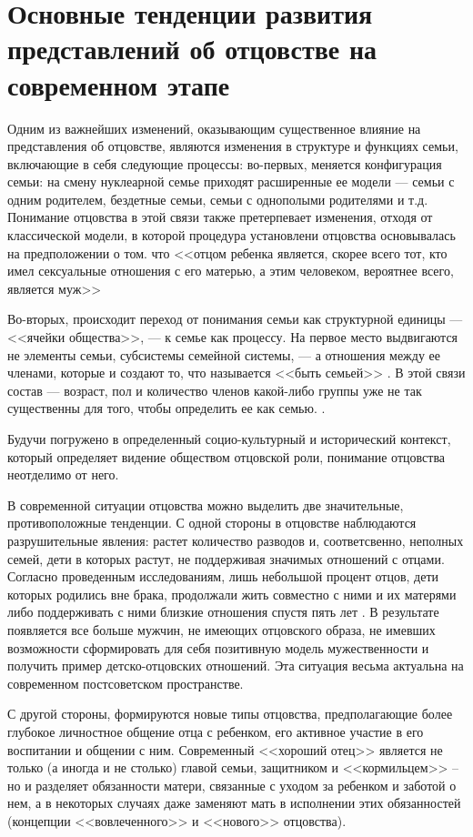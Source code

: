 \documentclass{../../common/thesisbyxetex}
\begin{document}
\section{Основные тенденции развития представлений об отцовстве на современном этапе}

Одним из важнейших изменений, оказывающим существенное влияние на представления об отцовстве,
являются
изменения в структуре и функциях семьи,  включающие в себя следующие процессы:
во-первых, меняется конфигурация семьи: на смену нуклеарной семье приходят расширенные
ее модели --- семьи с одним родителем, бездетные семьи, семьи с однополыми родителями и т.д.
Понимание отцовства
в этой связи также претерпевает изменения, отходя от классической модели, в которой процедура
установлени отцовства основывалась на предположении о том. что <<отцом ребенка является, скорее
всего
 тот, кто имел сексуальные отношения с его матерью, а этим человеком, вероятнее всего,
является муж>> \cite[318]{legfat}

Во-вторых, происходит переход от понимания семьи как структурной единицы --- <<ячейки общества>>,
--- к семье как процессу. На первое место выдвигаются не элементы семьи, субсистемы семейной
системы, --- а отношения между ее членами, которые и создают то, что называется <<быть семьей>>
\cite{fam}. В этой связи состав  --- возраст, пол и количество  членов какой-либо группы уже не так
существенны для того, чтобы определить  ее как семью. \cite[15]{fatpsy}.

Будучи погружено в определенный социо-культурный и исторический контекст, который определяет
видение обществом
отцовской роли, понимание отцовства неотделимо от него.

В современной ситуации отцовства можно выделить две значительные, противоположные
тенденции. С одной стороны  в отцовстве наблюдаются разрушительные явления: растет количество
разводов и, соответсвенно, неполных семей, дети в которых растут, не поддерживая значимых отношений
с отцами. Согласно проведенным исследованиям, лишь небольшой процент отцов, дети которых
родились вне брака, продолжали жить совместно с ними и их матерями либо поддерживать с ними близкие
отношения спустя пять лет \cite{long}. В результате появляется все больше мужчин, не имеющих
отцовского образа, не имевших возможности сформировать для себя позитивную модель мужественности и
получить пример детско-отцовских отношений. Эта ситуация весьма актуальна на современном
постсоветском пространстве.

С другой стороны, формируются новые типы отцовства, предполагающие более глубокое личностное 
общение отца с ребенком, его активное участие в его воспитании и общении с ним. Современный 
<<хороший отец>> является не только (а иногда и не столько) главой семьи, защитником и 
<<кормильцем>> -- но и разделяет обязанности матери, связанные с уходом за ребенком и заботой о 
нем, а в некоторых случаях даже заменяют мать в исполнении этих обязанностей (концепции 
<<вовлеченного>> и  <<нового>> отцовства).
\end{document}
